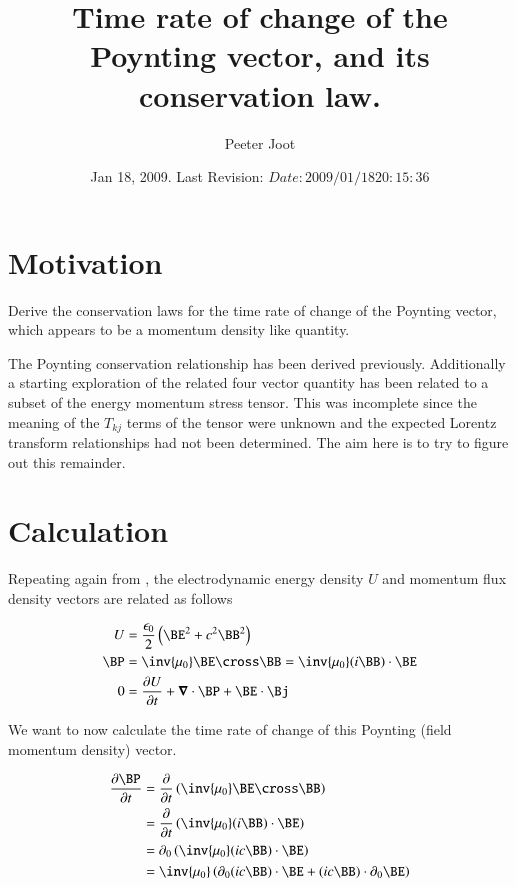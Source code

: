 \documentclass{article}
\title{ Time rate of change of the Poynting vector, and its conservation law. }
\author{Peeter Joot}
\date{ Jan 18, 2009.  Last Revision: $Date: 2009/01/18 20:15:36 $ }
\begin{document}
\maketitle{}
\tableofcontents

\section{ Motivation }

Derive the conservation laws for the time rate of change of the Poynting vector, which appears to be a momentum density like quantity.

The Poynting conservation relationship has been derived previously.  Additionally a starting
exploration
\cite{PJemstresstensor}
of the related four vector quantity has been related to a subset of the energy momentum stress tensor.
This was incomplete since the meaning of the $T_{kj}$ terms of the tensor were unknown and the expected
Lorentz transform relationships had not been determined.  The aim here is to try to figure out this remainder.

\section{ Calculation }

Repeating again from \cite{PJpoynting}, the electrodynamic energy density $U$ and momentum flux density vectors are related as follows

\begin{align}\label{eqn:fromPoyntingNotes}
U &= \frac{\epsilon_0}{2}\left( \BE^2 + c^2 \BB^2 \right) \\
\BP &= \inv{\mu_0}\BE \cross \BB = \inv{\mu_0} (i \BB) \cdot \BE \\
0 &= \PD{t}{U} + \spacegrad \cdot \BP + \BE \cdot \Bj
\end{align}

We want to now calculate the time rate of change of this Poynting (field momentum density) vector.

\begin{align*}
\PD{t}{\BP}
&= \PD{t}{} \left( \inv{\mu_0} \BE \cross \BB \right) \\
&= \PD{t}{} \left( \inv{\mu_0}(i\BB) \cdot \BE \right) \\
&= \partial_0 \left( \inv{\mu_0}(i c\BB) \cdot \BE \right) \\
&= \inv{\mu_0} \left( \partial_0 (i c\BB) \cdot \BE  + (i c\BB) \cdot \partial_0 \BE  \right)
\end{align*}
\end{document}
